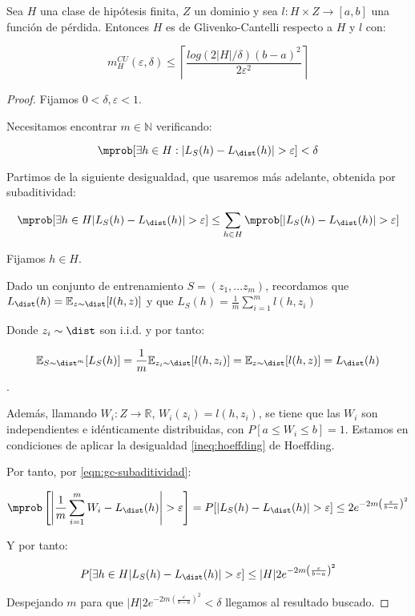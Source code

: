   
\begin{fact}
Sea $H$ una clase de hipótesis finita, $Z$ un dominio y sea $l : H \times Z \rightarrow [a,b]$ una función de pérdida.
Entonces $H$ es de Glivenko-Cantelli respecto a $H$ y $l$ con:

\[m_{H}^{CU}(\varepsilon, \delta) \le \left\lceil \frac{log(2|H|/\delta)(b-a)^2}{2\varepsilon^2} \right\rceil\]
\label{fact:finitas-gc}
\end{fact}
  \begin{proof}
  Fijamos $0 < \delta, \varepsilon < 1$. 
  
  Necesitamos encontrar $m\in \mathbb{N}$ verificando:

  \[\mprob [\exists h\in H : |L_S(h) - L_{\dist}(h)| > \varepsilon] < \delta\]

  Partimos de la siguiente desigualdad, que usaremos más adelante, obtenida por subaditividad:

  \begin{equation}
  \mprob [\exists h\in H |L_S(h) - L_{\dist}(h)| > \varepsilon] \le 
  \sum_{h \in H} \mprob [|L_S(h) - L_{\dist}(h)| > \varepsilon]
  \label{eqn:gc-subaditividad}
  \end{equation}

  Fijamos $h \in H$.

  Dado un conjunto de entrenamiento $S = (z_1, \ldots z_m)$, recordamos que 
  $L_{\dist} (h) = \mathbb{E}_{z\sim \dist} [l(h,z)]$ y que 
  $L_{S}(h) = \frac{1}{m} \sum_{i=1}^m l(h,z_i)$

  Donde $z_i \sim \dist$ son i.i.d. y por tanto:
  
  \[\mathbb{E}_{S \sim \dist^m} [L_S(h)] = \frac{1}{m} \mathbb{E}_{z_i \sim \dist} [l(h,z_i)] =  
    \mathbb{E}_{z \sim \dist} [l(h,z)] = L_{\dist} (h)\]. 
  
  Además, llamando $W_i:Z \rightarrow \mathbb{R}$, $W_i (z_i) = l(h,z_i)$, se tiene que las $W_i$ son 
  independientes e idénticamente distribuidas, con $P[a \le W_i \le b] = 1$. 
  Estamos en condiciones de aplicar la desigualdad \ref{ineq:hoeffding} de Hoeffding.

  Por tanto, por \eqref{eqn:gc-subaditividad}:

  \[\mprob \left[\left| \frac{1}{m} \sum_{i=1}^m W_i - L_{\dist} (h) \right| > \varepsilon\right] = 
    P [|L_S(h) - L_{\dist}(h)| > \varepsilon] \le 2e^{-2m \left( \frac{\varepsilon}{b-a} \right)^2}\]

  Y por tanto:

  \[P [\exists h\in H |L_S(h) - L_{\dist}(h)| > \varepsilon] \le 
   |H| 2e^{-2m \left( \frac{\varepsilon}{b-a} \right)^2}\]

  Despejando $m$ para que $|H| 2e^{-2m \left( \frac{\varepsilon}{b-a} \right)^2} < \delta$ 
  llegamos al resultado buscado.
  \end{proof}

